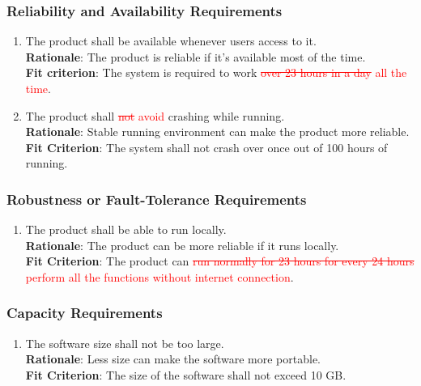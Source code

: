 \documentclass{article}
\begin{document}
\subsubsection{Reliability and Availability Requirements}
\begin{enumerate}[PR4.1]
    \item The product shall be available whenever users access to it.\\
    \textbf{Rationale}: The product is reliable if it's available most of the time.\\
    \textbf{Fit criterion}: The system is required to work \textcolor{red}{\st{over 23 hours in a
     day} all the time}.
    
    \item The product shall \textcolor{red}{\st{not} avoid} crashing while running.\\
    \textbf{Rationale}: Stable running environment can make the product more reliable.\\
    \textbf{Fit Criterion}: The system shall not crash over once out of 100 hours of running.\\
\end{enumerate}
\subsubsection{Robustness or Fault-Tolerance Requirements}
\begin{enumerate}[PR5.1]
    \item The product shall be able to run locally.\\
    \textbf{Rationale}: The product can be more reliable if it runs locally.\\
    \textbf{Fit Criterion}: The product can \textcolor{red}{\st{run normally for 23 hours for every 24
     hours} perform all the functions without internet connection}.
\end{enumerate}
\subsubsection{Capacity Requirements}
\begin{enumerate}[PR6.1]
    \item The software size shall not be too large.\\
    \textbf{Rationale}: Less size can make the software more portable.\\
    \textbf{Fit Criterion}: The size of the software shall not exceed 10 GB.
\end{enumerate}
\end{document}

